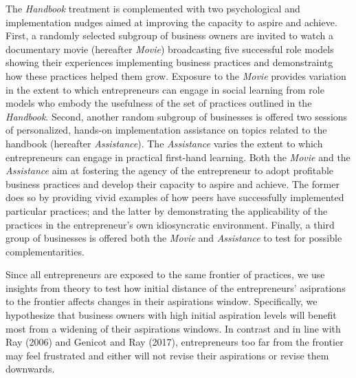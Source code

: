 \documentclass[11.5pt]{article}
\begin{document}
The \emph{Handbook} treatment is complemented with two psychological and implementation nudges aimed at improving the capacity to aspire and achieve. First, a randomly selected subgroup of business owners are invited to watch a documentary movie  (hereafter \emph{Movie}) broadcasting five successful role models showing their experiences implementing business practices and demonstraintg how these practices helped them grow. Exposure to the \emph{Movie} provides variation in the extent to which entrepreneurs can engage in social learning from role models who embody the usefulness of the set of practices outlined in the \emph{Handbook}. Second, another random subgroup of businesses is offered two sessions of personalized, hands-on implementation assistance on topics related to the handbook (hereafter \emph{Assistance}). The \emph{Assistance} varies the extent to which entrepreneurs can engage in practical first-hand learning. Both the \emph{Movie} and the \emph{Assistance} aim at fostering the agency of the entrepreneur to adopt profitable business practices and develop their capacity to aspire and achieve. The former does so by providing vivid examples of how peers have successfully implemented particular practices; and the latter by demonstrating the applicability of the practices in the entrepreneur's own idiosyncratic environment. Finally, a third group of businesses is offered both the \emph{Movie} and \emph{Assistance} to test for possible complementarities. 

Since all entrepreneurs are exposed to the same frontier of practices, we use insights from theory to test how initial distance of the entrepreneurs' asiprations to the frontier affects changes in their aspirations window. Specifically, we hypothesize that business owners with high initial aspiration levels will benefit most from a widening of their aspirations windows. In contrast and in line with Ray (2006) and Genicot and Ray (2017), entrepreneurs too far from the frontier may feel frustrated and either will not revise their aspirations or revise them downwards. 
\end{document}
